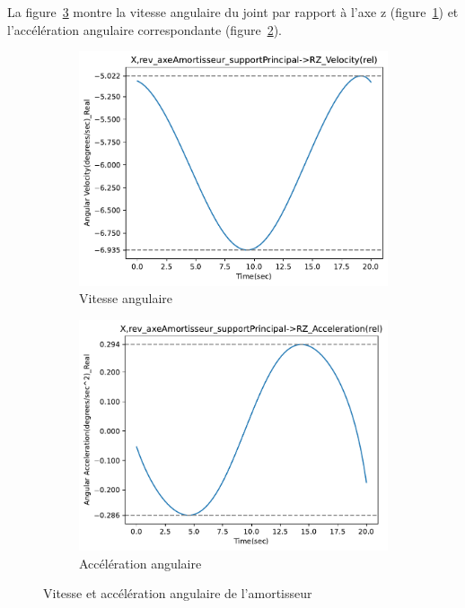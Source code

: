 \documentclass{article}
\begin{document}
La figure~\ref{fig:rot_vel_accel_axe_principal} montre la vitesse angulaire du joint par rapport à l'axe z (figure~\ref{fig:velocity_main_axis}) et l'accélération angulaire correspondante (figure~\ref{fig:accel_main_axis}).
\begin{figure}[h]
    \centering
    \begin{subfigure}[h]{.48\textwidth}        
        \includegraphics[width=\textwidth]{data/velocity_axeAmortisseur.pdf}
        \caption{Vitesse angulaire}
        \label{fig:velocity_main_axis}
    \end{subfigure}
    \hfill
    \begin{subfigure}[h]{.48\textwidth}        
        \includegraphics[width=\textwidth]{data/amortisseur_axeAmortisseur.pdf}
        \caption{Accélération angulaire}
        \label{fig:accel_main_axis}
    \end{subfigure}
    \caption{Vitesse et accélération angulaire de l'amortisseur}
    \label{fig:rot_vel_accel_axe_principal}
\end{figure}
\end{document}
